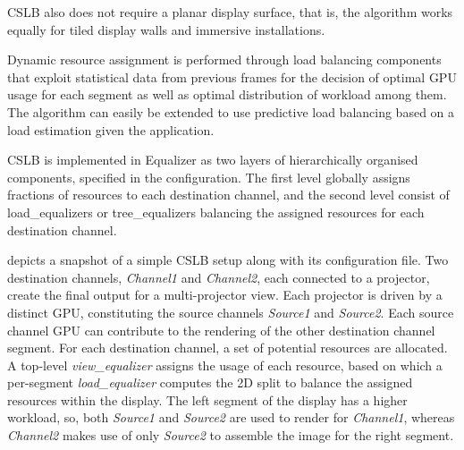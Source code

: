 CSLB also does not require a planar display surface, that is, the algorithm
works equally for tiled display walls and immersive installations.

Dynamic resource assignment is performed through load balancing components that
exploit statistical data from previous frames for the decision of optimal GPU
usage for each segment as well as optimal distribution of workload among them.
The algorithm can easily be extended to use predictive load balancing based on
a load estimation given the application.

CSLB is implemented in Equalizer as two layers of hierarchically organised
components, specified in the configuration. The first level globally assigns
fractions of resources to each destination channel, and the second level
consist of load\_equalizers or tree\_equalizers balancing the assigned
resources for each destination channel.

 depicts a snapshot of a simple CSLB setup along with its
configuration file. Two destination channels, {\em Channel1} and {\em
Channel2}, each connected to a projector, create the final output for a
multi-projector view. Each projector is driven by a distinct GPU, constituting
the source channels {\em Source1} and {\em Source2}. Each source channel GPU
can contribute to the rendering of the other destination channel segment. For
each destination channel, a set of potential resources are allocated. A
top-level {\em view\_equalizer} assigns the usage of each resource, based on
which a per-segment {\em load\_equalizer} computes the 2D split to balance the
assigned resources within the display. The left segment of the display has a
higher workload, so, both {\em Source1} and {\em Source2} are used to render
for {\em Channel1}, whereas {\em Channel2} makes use of only {\em Source2} to
assemble the image for the right segment.

